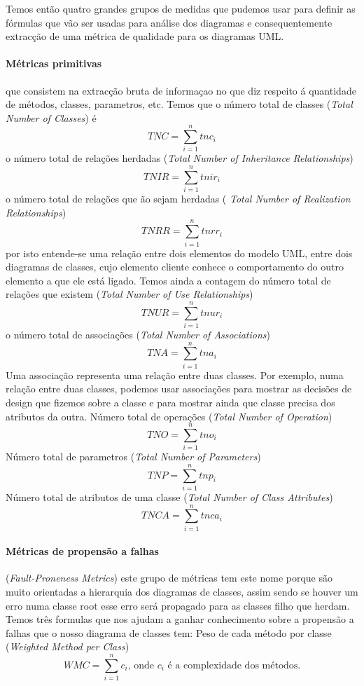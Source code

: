 Temos então quatro grandes grupos de medidas que pudemos usar para definir as fórmulas que vão ser usadas para análise dos diagramas e
consequentemente extracção de uma métrica de qualidade para os diagramas UML.
\paragraph{Métricas primitivas} que consistem na extracção bruta de informaçao no que diz respeito á quantidade de métodos, classes, parametros, etc.
Temos que o número total de classes (\textit{Total Number of Classes}) é $$TNC = \sum_{i=1}^{n} tnc_i $$
o número total de relações herdadas (\textit{Total Number of Inheritance Relationships})  $$TNIR = \sum_{i=1}^{n} tnir_i $$
o número total de relações que ão sejam herdadas (\textit{ Total Number of Realization Relationships})  $$TNRR = \sum_{i=1}^{n} tnrr_i $$ por isto entende-se
uma relação entre dois elementos do modelo UML, entre dois diagramas de classes, cujo elemento cliente conhece o comportamento do outro elemento a que ele está ligado.
Temos ainda a contagem do número total de relações que existem (\textit{Total Number of Use Relationships})  $$TNUR = \sum_{i=1}^{n} tnur_i $$
o número total de associações (\textit{Total Number of Associations})    $$TNA = \sum_{i=1}^{n} tna_i $$
Uma associação representa uma relação entre duas classes. Por exemplo, numa relação entre duas classes, podemos usar associações para mostrar as decisões de design
que fizemos sobre a classe e para mostrar ainda que classe precisa dos atributos da outra.
Número total de operações (\textit{Total Number of Operation})   $$TNO = \sum_{i=1}^{n} tno_i $$
Número total de parametros (\textit{Total Number of Parameters})  $$TNP = \sum_{i=1}^{n} tnp_i $$
Número total de atributos de uma classe (\textit{Total Number of Class Attributes})  $$TNCA = \sum_{i=1}^{n} tnca_i $$

\paragraph{Métricas de propensão a falhas} (\textit{Fault-Proneness Metrics}) este grupo de métricas tem este nome porque são muito orientadas a hierarquia dos diagramas
de classes, assim sendo se houver um erro numa classe root esse erro será propagado para as classes filho que herdam.
Temos três formulas que nos ajudam a ganhar conhecimento sobre a propensão a falhas que o nosso diagrama de classes tem:
Peso de cada método por classe (\textit{Weighted Method per Class}) 
\begin{displaymath}
WMC = \sum_{i=1}^{n} c_i  \textrm{, onde $c_i$ é a complexidade dos métodos.}
\end{displaymath}

